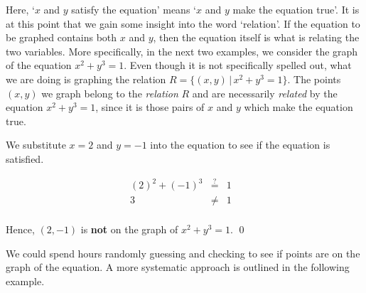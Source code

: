
\medskip

Here, `$x$ and $y$ satisfy the equation' means `$x$ and $y$ make the equation true'.  It is at this point that we gain some insight into the word `relation'.  If the equation to be graphed contains both $x$ and $y$, then the equation itself is what is relating the two variables.  More specifically, in the next two examples, we consider the  graph of the equation $x^2+y^3=1$. Even though it is not specifically spelled out, what we are doing is graphing the relation $R = \{ (x,y) \, | \, x^2+y^3 = 1\}$.  The points $(x,y)$ we graph belong to the \textit{relation} $R$ and are necessarily \textit{related} by the equation  $x^2+y^3 = 1$, since it is those pairs of $x$ and $y$ which make the equation true.

\medskip

{
We substitute $x=2$ and $y=-1$ into the equation to see if the equation is satisfied.

\setlength{\extrarowheight}{2pt}

\[ \begin{array}{rclr}   
 (2)^2+(-1)^3 & \stackrel{?}{=} & 1 & \\ 
            3 & \neq & 1 & \\ 
            \end{array} \]

Hence, $(2,-1)$ is \textbf{not} on the graph of $x^2 + y^3 = 1$.  \qed
}

\medskip

We could spend hours randomly guessing and checking to see if points are on the graph of the equation.  A more systematic approach is outlined in the following example.

\pagebreak

